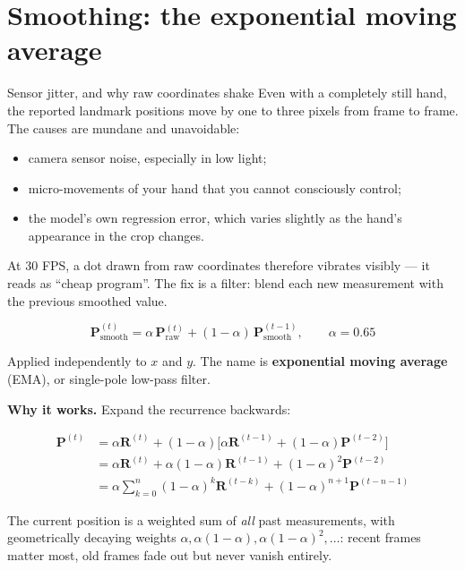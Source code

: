 \section{Smoothing: the exponential moving average}
\label{sec:ema}

\begin{mathdeepdive}{Sensor jitter, and why raw coordinates shake}
Even with a completely still hand, the reported landmark positions move by one to three pixels from
frame to frame. The causes are mundane and unavoidable:

\begin{itemize}
  \item camera sensor noise, especially in low light;
  \item micro-movements of your hand that you cannot consciously control;
  \item the model's own regression error, which varies slightly as the hand's appearance in the crop
        changes.
\end{itemize}

At 30 FPS, a dot drawn from raw coordinates therefore vibrates visibly --- it reads as ``cheap
program''. The fix is a filter: blend each new measurement with the previous smoothed value.

$$\mathbf{P}^{(t)}_{\text{smooth}} = \alpha\,\mathbf{P}^{(t)}_{\text{raw}}
                                  + (1-\alpha)\,\mathbf{P}^{(t-1)}_{\text{smooth}},
\qquad \alpha = 0.65$$

Applied independently to $x$ and $y$. The name is \textbf{exponential moving average} (EMA), or
single-pole low-pass filter.

\textbf{Why it works.} Expand the recurrence backwards:

\begin{align*}
\mathbf{P}^{(t)} &= \alpha \mathbf{R}^{(t)} + (1-\alpha)\Big[\alpha \mathbf{R}^{(t-1)}
                    + (1-\alpha)\mathbf{P}^{(t-2)}\Big] \\
                 &= \alpha \mathbf{R}^{(t)} + \alpha(1-\alpha)\mathbf{R}^{(t-1)}
                    + (1-\alpha)^2 \mathbf{P}^{(t-2)} \\
                 &= \alpha \sum_{k=0}^{n} (1-\alpha)^k \mathbf{R}^{(t-k)}
                    + (1-\alpha)^{n+1}\mathbf{P}^{(t-n-1)}
\end{align*}

The current position is a weighted sum of \emph{all} past measurements, with geometrically decaying
weights $\alpha, \alpha(1-\alpha), \alpha(1-\alpha)^2, \dots$: recent frames matter most, old frames
fade out but never vanish entirely.


\end{mathdeepdive}
